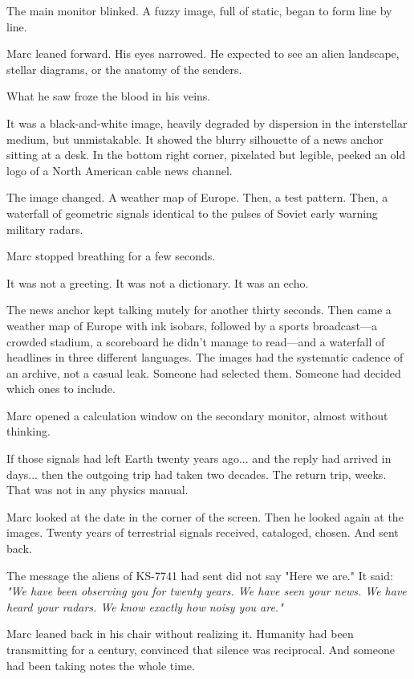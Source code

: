 \documentclass[11pt,a5paper,twoside]{book}
\begin{document}
The main monitor blinked. A fuzzy image, full of static, began to form line by line.

Marc leaned forward. His eyes narrowed. He expected to see an alien landscape, stellar diagrams, or the anatomy of the senders.

What he saw froze the blood in his veins.

It was a black-and-white image, heavily degraded by dispersion in the interstellar medium, but unmistakable. It showed the blurry silhouette of a news anchor sitting at a desk. In the bottom right corner, pixelated but legible, peeked an old logo of a North American cable news channel.

The image changed. A weather map of Europe. Then, a test pattern. Then, a waterfall of geometric signals identical to the pulses of Soviet early warning military radars.

Marc stopped breathing for a few seconds.

It was not a greeting. It was not a dictionary. It was an echo.

The news anchor kept talking mutely for another thirty seconds. Then came a weather map of Europe with ink isobars, followed by a sports broadcast—a crowded stadium, a scoreboard he didn't manage to read—and a waterfall of headlines in three different languages. The images had the systematic cadence of an archive, not a casual leak. Someone had selected them. Someone had decided which ones to include.

Marc opened a calculation window on the secondary monitor, almost without thinking.

If those signals had left Earth twenty years ago... and the reply had arrived in days... then the outgoing trip had taken two decades. The return trip, weeks. That was not in any physics manual.

Marc looked at the date in the corner of the screen. Then he looked again at the images. Twenty years of terrestrial signals received, cataloged, chosen. And sent back.

The message the aliens of KS-7741 had sent did not say "Here we are." It said: \textit{"We have been observing you for twenty years. We have seen your news. We have heard your radars. We know exactly how noisy you are."}

Marc leaned back in his chair without realizing it. Humanity had been transmitting for a century, convinced that silence was reciprocal. And someone had been taking notes the whole time.
\end{document}
